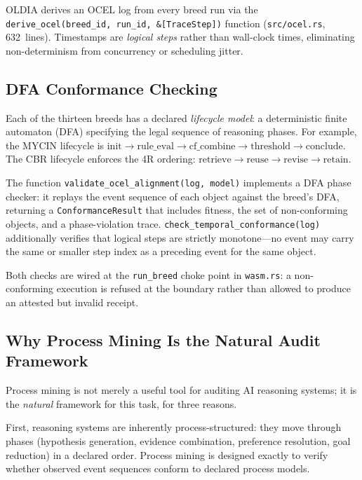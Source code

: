 OLDIA derives an OCEL log from every breed run via the
\texttt{derive\_ocel(breed\_id, run\_id, \&[TraceStep])} function
(\texttt{src/ocel.rs}, 632~lines).  Timestamps are \emph{logical steps}
rather than wall-clock times, eliminating non-determinism from concurrency or
scheduling jitter.

\subsection{DFA Conformance Checking}
\label{subsec:dfa}

Each of the thirteen breeds has a declared \emph{lifecycle model}: a
deterministic finite automaton (DFA) specifying the legal sequence of
reasoning phases.  For example, the MYCIN lifecycle is
$\text{init} \to \text{rule\_eval} \to \text{cf\_combine} \to \text{threshold} \to \text{conclude}$.
The CBR lifecycle enforces the 4R ordering:
$\text{retrieve} \to \text{reuse} \to \text{revise} \to \text{retain}$.

The function \texttt{validate\_ocel\_alignment(log, model)} implements a DFA
phase checker: it replays the event sequence of each object against the
breed's DFA, returning a \texttt{ConformanceResult} that includes fitness,
the set of non-conforming objects, and a phase-violation trace.
\texttt{check\_temporal\_conformance(log)} additionally verifies that logical
steps are strictly monotone---no event may carry the same or smaller step
index as a preceding event for the same object.

Both checks are wired at the \texttt{run\_breed} choke point in
\texttt{wasm.rs}: a non-conforming execution is refused at the boundary
rather than allowed to produce an attested but invalid receipt.

\subsection{Why Process Mining Is the Natural Audit Framework}
\label{subsec:pm-audit}

Process mining is not merely a useful tool for auditing AI reasoning systems;
it is the \emph{natural} framework for this task, for three reasons.

First, reasoning systems are inherently process-structured: they move through
phases (hypothesis generation, evidence combination, preference resolution,
goal reduction) in a declared order.  Process mining is designed exactly to
verify whether observed event sequences conform to declared process models.

